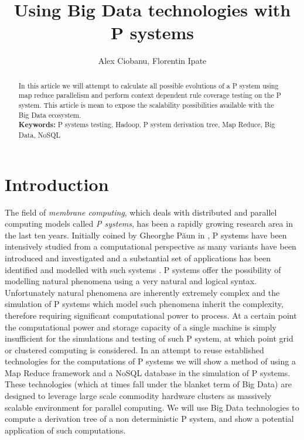 \documentclass[runningheads]{llncs}
\title{Using Big Data technologies with P systems}
\author{Alex Ciobanu\inst{1}, Florentin Ipate\inst{1}}
\institute{Department of Computer Science, University of Pitesti\\
Str. Targu din Vale 1, 110040 Pitesti, Romania \\
\email{florentin.ipate@ifsoft.ro}
}
\begin{document}
\maketitle


\begin{abstract} 
In this article we will attempt to calculate all possible evolutions of a P system using map reduce parallelism and perform context dependent rule coverage testing on the P system. This article is mean to expose the scalability possibilities available with the Big Data ecosystem.  \\


\textbf{Keywords:} P systems testing, Hadoop, P system derivation tree, Map Reduce, Big Data, NoSQL 

\end{abstract}



\section{Introduction}

The field of \emph{membrane computing}, which deals with distributed and parallel computing models called \emph{P systems}, has been a rapidly growing research area in the last ten years. Initially coined by Gheorghe P\u{a}un in \cite{Paun00}, P systems have been intensively studied from a computational perspective as many variants have been introduced and investigated and a substantial set of applications has been identified and modelled with such systems \cite{PaunRS10}. P systems offer the possibility of modelling natural phenomena using a very natural and logical syntax. Unfortunately natural phenomena are inherently extremely complex and the simulation of P systems which model such phenomena inherit the complexity, therefore requiring significant computational power to process. At a certain point the computational power and storage capacity of a single machine is simply insufficient for the simulations and testing of such P system, at which point grid or clustered computing is considered. In an attempt to reuse established technologies for the computations of P systems we will show a method of using a Map Reduce framework and a NoSQL database in the simulation of P systems. These technologies (which at times fall under the blanket term of Big Data) are designed to leverage large scale commodity hardware clusters as massively scalable environment for parallel computing. We will use Big Data technologies to compute a derivation tree of a non deterministic P system, and show a potential application of such computations. 
\end{document}
